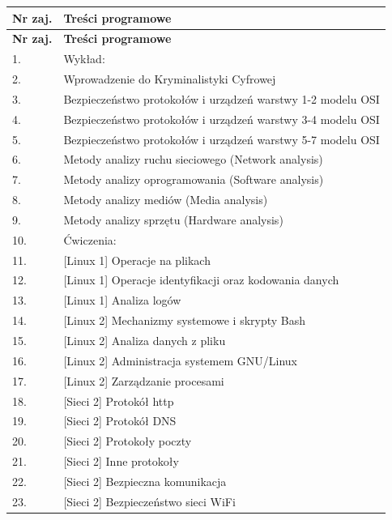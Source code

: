 \documentclass[12pt, a4paper]{article}
\newcommand{\thdrule}{\noalign{\global\setlength{\extrarowheight}{0pt}}}
\newcommand{\thdend}{\noalign{\global\setlength{\extrarowheight}{3pt}}}
\begin{document}
{\scriptsize
\begin{longtable}{m{1.5cm}m{14.5cm}}
\thdrule\toprule
\rowcolor{pjatkRed} {\color{white}\textbf{Nr zaj.}} & {\color{white}\textbf{Treści programowe}} \\
\midrule\thdend
\endfirsthead
\thdrule\toprule
\rowcolor{pjatkRed} {\color{white}\textbf{Nr zaj.}} & {\color{white}\textbf{Treści programowe}} \\
\midrule\thdend
\endhead
  \rowcolor{tableRowLight} 1. & Wykład: \\
  \rowcolor{tableRowAlt} 2. & Wprowadzenie do Kryminalistyki Cyfrowej \\
  \rowcolor{tableRowLight} 3. & Bezpieczeństwo protokołów i urządzeń warstwy 1-2 modelu OSI \\
  \rowcolor{tableRowAlt} 4. & Bezpieczeństwo protokołów i urządzeń warstwy 3-4 modelu OSI \\
  \rowcolor{tableRowLight} 5. & Bezpieczeństwo protokołów i urządzeń warstwy 5-7 modelu OSI \\
  \rowcolor{tableRowAlt} 6. & Metody analizy ruchu sieciowego (Network analysis) \\
  \rowcolor{tableRowLight} 7. & Metody analizy oprogramowania (Software analysis) \\
  \rowcolor{tableRowAlt} 8. & Metody analizy mediów (Media analysis) \\
  \rowcolor{tableRowLight} 9. & Metody analizy sprzętu (Hardware analysis) \\
  \rowcolor{tableRowAlt} 10. & Ćwiczenia: \\
  \rowcolor{tableRowLight} 11. & {[}Linux 1{]} Operacje na plikach \\
  \rowcolor{tableRowAlt} 12. & {[}Linux 1{]} Operacje identyfikacji oraz kodowania danych \\
  \rowcolor{tableRowLight} 13. & {[}Linux 1{]} Analiza logów \\
  \rowcolor{tableRowAlt} 14. & {[}Linux 2{]} Mechanizmy systemowe i skrypty Bash \\
  \rowcolor{tableRowLight} 15. & {[}Linux 2{]} Analiza danych z pliku \\
  \rowcolor{tableRowAlt} 16. & {[}Linux 2{]} Administracja systemem GNU/Linux \\
  \rowcolor{tableRowLight} 17. & {[}Linux 2{]} Zarządzanie procesami \\
  \rowcolor{tableRowAlt} 18. & {[}Sieci 2{]} Protokół http \\
  \rowcolor{tableRowLight} 19. & {[}Sieci 2{]} Protokół DNS \\
  \rowcolor{tableRowAlt} 20. & {[}Sieci 2{]} Protokoły poczty \\
  \rowcolor{tableRowLight} 21. & {[}Sieci 2{]} Inne protokoły \\
  \rowcolor{tableRowAlt} 22. & {[}Sieci 2{]} Bezpieczna komunikacja \\
  \rowcolor{tableRowLight} 23. & {[}Sieci 2{]} Bezpieczeństwo sieci WiFi \\
\bottomrule
\end{longtable}}
\end{document}
